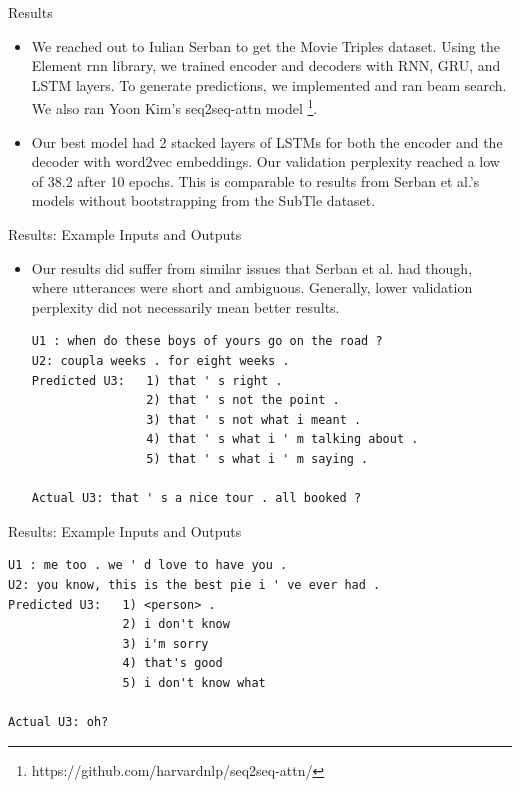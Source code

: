 \documentclass{beamer}
\begin{document}
\begin{frame}{Results}
\begin{itemize}
\item We reached out to Iulian Serban to get the Movie Triples dataset. Using the Element rnn library, we trained encoder and decoders with RNN, GRU, and LSTM layers. To generate predictions, we implemented and ran beam search. We also ran Yoon Kim's seq2seq-attn model \footnote{https://github.com/harvardnlp/seq2seq-attn/}.

\item Our best model had 2 stacked layers of LSTMs for both the encoder and the decoder with word2vec embeddings. Our validation perplexity reached a low of 38.2 after 10 epochs. This is comparable to results from Serban et al.'s models without bootstrapping from the SubTle dataset.

\end{itemize}
\end{frame}

\begin{frame}[fragile]{Results: Example Inputs and Outputs}
\begin{itemize}
\item Our results did suffer from similar issues that Serban et al. had though, where utterances were short and ambiguous. Generally, lower validation perplexity did not necessarily mean better results.\\


\begin{verbatim}
U1 : when do these boys of yours go on the road ?
U2: coupla weeks . for eight weeks .
Predicted U3:   1) that ' s right .
                2) that ' s not the point .
                3) that ' s not what i meant .
                4) that ' s what i ' m talking about .
                5) that ' s what i ' m saying .
    
Actual U3: that ' s a nice tour . all booked ?
\end{verbatim}

\end{itemize}
\end{frame}

\begin{frame}[fragile]{Results: Example Inputs and Outputs}
\begin{itemize}

\begin{verbatim}
U1 : me too . we ' d love to have you . 
U2: you know, this is the best pie i ' ve ever had .
Predicted U3:   1) <person> .
                2) i don't know
                3) i'm sorry
                4) that's good
                5) i don't know what
    
Actual U3: oh? 
\end{verbatim}
\end{itemize}

\end{frame}
\end{document}
